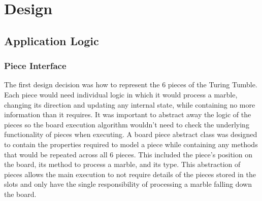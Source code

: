 \documentclass{l4proj}
\begin{document}
\chapter{Design}
\section{Application Logic}
\label{section:design}

\subsection{Piece Interface}
The first design decision was how to represent the 6 pieces of the Turing Tumble. Each piece would need individual logic in which it would process a marble, changing its direction and updating any internal state, while containing no more information than it requires. It was important to abstract away the logic of the pieces so the board execution algorithm wouldn't need to check the underlying functionality of pieces when executing. A board piece abstract class was designed to contain the properties required to model a piece while containing any methods that would be repeated across all 6 pieces. This included the piece's position on the board, its method to process a marble, and its type. This abstraction of pieces allows the main execution to not require details of the pieces stored in the slots and only have the single responsibility of processing a marble falling down the board.
\end{document}
